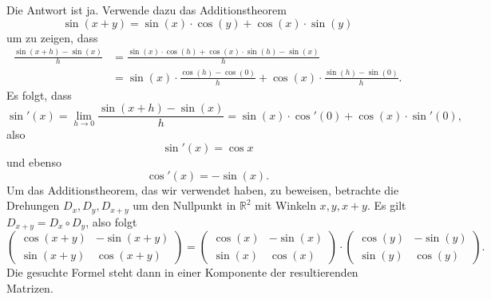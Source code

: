 \documentclass[../main.tex]{subfiles}
\begin{document}
Die Antwort ist ja. Verwende dazu das Additionstheorem
\[
  \sin(x + y) = \sin(x) \cdot \cos(y) + \cos(x) \cdot \sin(y)
\]
um zu zeigen, dass
\begin{align*}
  \frac{\sin( x + h ) - \sin(x)}{h}
  &=
  \frac{\sin(x) \cdot \cos(h) + \cos(x) \cdot \sin(h) - \sin(x)}{h}
  \\ &
  = \sin(x) \cdot \frac{\cos(h) - \cos(0)}{h} + \cos(x) \cdot \frac{\sin(h) - \sin(0)}{h}.
\end{align*}
Es folgt, dass
\[
  \sin'(x) = \lim_{h \to 0} \frac{\sin(x + h) - \sin(x)}{h} =
  \sin(x) \cdot \cos'(0) + \cos(x) \cdot \sin' (0),
\]
also
\[
  \sin'(x) = \cos x
\]
und ebenso
\[
  \cos'(x) = -\sin(x).
\]
Um das Additionstheorem, das wir verwendet haben, zu beweisen,
betrachte die Drehungen $D_x, D_y, D_{x + y}$ um den Nullpunkt
in $\mathbb{R}^2$ mit Winkeln $x, y, x + y $.
Es gilt $D_{x + y} = D_x \circ D_y$, also folgt
\[
  \begin{pmatrix}
    \cos( x + y ) & - \sin(x + y) \\
    \sin( x + y ) & \cos(x + y)
  \end{pmatrix}
  =
  \begin{pmatrix}
    \cos(x) & -\sin(x) \\
    \sin(x) & \cos(x)
  \end{pmatrix}
  \cdot
  \begin{pmatrix}
    \cos(y) & -\sin(y) \\
    \sin(y) & \cos(y)
  \end{pmatrix}.
\]
Die gesuchte Formel steht dann in einer Komponente
der resultierenden Matrizen.
\end{document}
